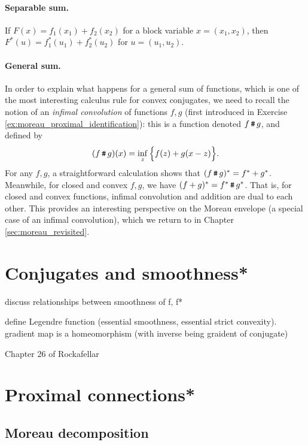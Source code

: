 \paragraph{Separable sum.}

If $F(x) = f_1(x_1) + f_2(x_2)$ for a block variable $x = (x_1, x_2)$, then
$F^*(u) = f_1^*(u_1) + f_2^*(u_2)$ for $u = (u_1,u_2)$. 

\paragraph{General sum.}

In order to explain what happens for a general sum of functions, which is one of
the most interesting calculus rule for convex conjugates, we need to 
recall the notion of an \emph{infimal convolution} of functions $f,g$ (first
introduced in Exercise \ref{ex:moreau_proximal_identification}): this is a
function denoted $f \operatorname{\texttt{\#}} g$, and defined by  
\[
(f \operatorname{\texttt{\#}} g)(x) = \inf_z \Big\{ f(z) + g(x-z) \Big\}.
\]
For any $f,g$, a straightforward calculation shows that $(f \operatorname{\texttt{\#}} g)^* = f^*
+ g^*$. Meanwhile, for closed and convex $f,g$, we have $(f + g)^* = f^*
\operatorname{\texttt{\#}} g^*$. That is, for closed and convex functions, infimal convolution and
addition are dual to each other. This provides an interesting perspective on the
Moreau envelope (a special case of an infimal convolution), which we return to
in Chapter \ref{sec:moreau_revisited}.   

\section{Conjugates and smoothness*}
\label{sec:conjugates_smoothness}

discuss relationships between smoothness of f, f* 

define Legendre function (essential smoothness, essential strict convexity).
gradient map is a homeomorphism (with inverse being graident of conjugate) 

Chapter 26 of Rockafellar

\section{Proximal connections*}

\subsection{Moreau decomposition}
\label{sec:moreau_decomposition}

